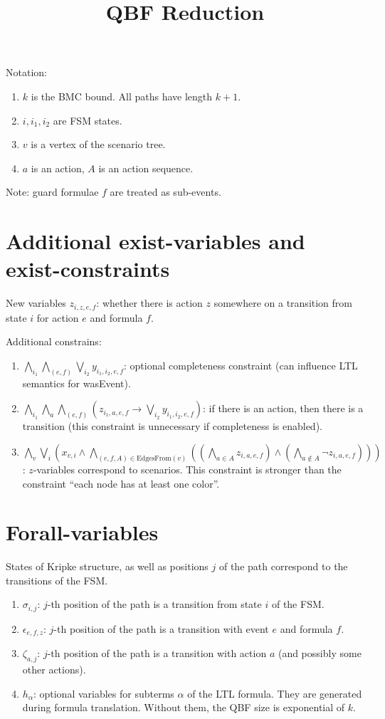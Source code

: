 \documentclass[a4paper]{article}
\title{QBF Reduction}
\begin{document}
Notation:

\begin{enumerate}
\item $k$ is the BMC bound. All paths have length $k + 1$.
\item $i, i_1, i_2$ are FSM states.
\item $v$ is a vertex of the scenario tree.
\item $a$ is an action, $A$ is an action sequence.
\end{enumerate}

Note: guard formulae $f$ are treated as sub-events.

\section{Additional exist-variables and exist-constraints}

New variables $z_{i, z, e, f}$: whether there is action $z$ somewhere on a transition from state $i$ for action $e$ and formula $f$.

Additional constrains:

\begin{enumerate}
\item $\bigwedge\limits_{i_1} \bigwedge\limits_{(e, f)} \bigvee\limits_{i_2} y_{i_1, i_2, e, f}$: optional completeness constraint (can influence LTL semantics for wasEvent).
\item $\bigwedge\limits_{i_1} \bigwedge\limits_a \bigwedge\limits_{(e, f)} \left( z_{i_1, a, e, f} \to \bigvee\limits_{i_2} y_{i_1, i_2, e, f}\right)$: if there is an action, then there is a transition (this constraint is unnecessary if completeness is enabled).
\item $\bigwedge\limits_{v} \bigvee\limits_{i} \left(x_{v, i} \land \bigwedge\limits_{(e, f, A) \in \mathrm{EdgesFrom}(v)} \left( \left(\bigwedge\limits_{a \in A} z_{i, a, e, f}\right) \land \left(\bigwedge\limits_{a \notin A} \neg z_{i, a, e, f}\right)\right)\right)$: $z$-variables correspond to scenarios. This constraint is stronger than the constraint ``each node has at least one color''.
\end{enumerate}

\section{Forall-variables}
States of Kripke structure, as well as positions $j$ of the path correspond to the transitions of the FSM. 
\begin{enumerate}
\item $\sigma_{i, j}$: $j$-th position of the path is a transition from state $i$ of the FSM.
\item $\epsilon_{e, f, z}$: $j$-th position of the path is a transition with event $e$ and formula $f$.
\item $\zeta_{a, j}$: $j$-th position of the path is a transition with action $a$ (and possibly some other actions).
\item $h_\alpha$: optional variables for subterms $\alpha$ of the LTL formula. They are generated during formula translation. Without them, the QBF size is exponential of $k$.
\end{enumerate}
\end{document}

